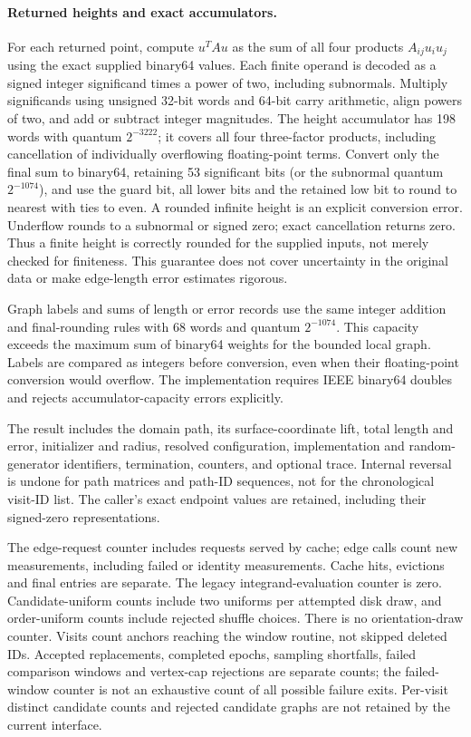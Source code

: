 \documentclass[11pt,letterpaper]{article}
\begin{document}
\paragraph{Returned heights and exact accumulators.}
For each returned point, compute $u^TAu$ as the sum of all four products
$A_{ij}u_i u_j$ using the exact supplied binary64 values. Each finite operand
is decoded as a signed integer significand times a power of two, including
subnormals. Multiply significands using unsigned 32-bit words and 64-bit
carry arithmetic, align powers of two, and add or subtract integer
magnitudes. The height accumulator has 198 words with quantum $2^{-3222}$;
it covers all four three-factor products, including cancellation of
individually overflowing floating-point terms. Convert only the final sum
to binary64, retaining 53 significant bits (or the subnormal quantum
$2^{-1074}$), and use the guard bit, all lower bits and the retained low bit
to round to nearest with ties to even. A rounded infinite height is an
explicit conversion error. Underflow rounds to a subnormal or signed zero;
exact cancellation returns zero. Thus a finite height is correctly rounded
for the supplied inputs, not merely checked for finiteness. This guarantee
does not cover uncertainty in the original data or make edge-length error
estimates rigorous.

Graph labels and sums of length or error records use the same integer
addition and final-rounding rules with 68 words and quantum $2^{-1074}$.
This capacity exceeds the maximum sum of binary64 weights for the bounded
local graph. Labels are compared as integers before conversion, even when
their floating-point conversion would overflow. The implementation requires
IEEE binary64 doubles and rejects accumulator-capacity errors explicitly.

The result includes the domain path, its surface-coordinate lift, total
length and error, initializer and radius, resolved configuration, implementation
and random-generator identifiers, termination, counters, and optional trace.
Internal reversal is undone for path matrices and path-ID sequences, not for
the chronological visit-ID list. The caller's exact endpoint values are
retained, including their signed-zero representations.

The edge-request counter includes requests served by cache; edge calls count
new measurements, including failed or identity measurements. Cache hits,
evictions and final entries are separate. The legacy integrand-evaluation
counter is zero. Candidate-uniform counts include two uniforms per attempted
disk draw, and order-uniform counts include rejected shuffle choices. There
is no orientation-draw counter. Visits count anchors reaching the window
routine, not skipped deleted IDs. Accepted replacements, completed epochs,
sampling shortfalls, failed comparison windows and vertex-cap rejections are
separate counts; the failed-window counter is not an exhaustive count of all
possible failure exits. Per-visit distinct candidate counts and rejected
candidate graphs are not retained by the current interface.
\end{document}
